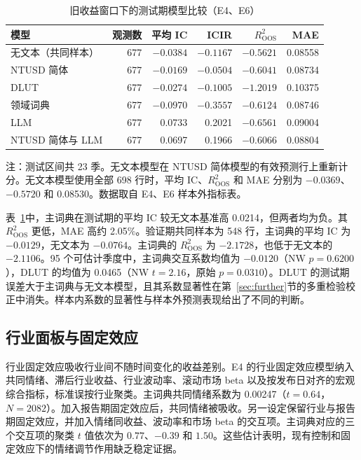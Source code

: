 \begin{table}[htbp]
  \centering\small
  \caption{旧收益窗口下的测试期模型比较（E4、E6）}\label{tab:model-oos}
  \begin{tabular}{lrrrrr}
    \toprule
    模型 & 观测数 & 平均 IC & ICIR & $R^2_{\mathrm{OOS}}$ & MAE \\
    \midrule
    无文本（共同样本） & 677 & $-0.0384$ & $-0.1167$ & $-0.5621$ & 0.08558 \\
    NTUSD 简体 & 677 & $-0.0169$ & $-0.0504$ & $-0.6041$ & 0.08734 \\
    DLUT & 677 & $-0.0274$ & $-0.1005$ & $-1.2019$ & 0.10375 \\
    领域词典 & 677 & $-0.0970$ & $-0.3557$ & $-0.6124$ & 0.08746 \\
    LLM & 677 & 0.0733 & 0.2021 & $-0.6561$ & 0.09004 \\
    NTUSD 简体与 LLM & 677 & 0.0697 & 0.1966 & $-0.6066$ & 0.08804 \\
    \bottomrule
  \end{tabular}
  \par\smallskip
  \parbox{0.9\linewidth}{\footnotesize 注：测试区间共 23 季。无文本模型在 NTUSD 简体模型的有效预测行上重新计分。无文本模型使用全部 698 行时，平均 IC、$R^2_{\mathrm{OOS}}$ 和 MAE 分别为 $-0.0369$、$-0.5720$ 和 0.08530。数据取自 E4、E6 样本外指标表。}
\end{table}

表~\ref{tab:model-oos}中，主词典在测试期的平均 IC 较无文本基准高 0.0214，但两者均为负。其 $R^2_{\mathrm{OOS}}$ 更低，MAE 高约 2.05\%。验证期共同样本为 548 行，主词典的平均 IC 为 $-0.0129$，无文本为 $-0.0764$。主词典的 $R^2_{\mathrm{OOS}}$ 为 $-2.1728$，也低于无文本的 $-2.1106$。95 个可估计季度中，主词典交互系数均值为 $-0.0120$（NW $p=0.6200$），DLUT 的均值为 0.0465（NW $t=2.16$，原始 $p=0.0310$）。DLUT 的测试期误差大于主词典与无文本模型，且其系数显著性在第~\ref{sec:further}节的多重检验校正中消失。样本内系数的显著性与样本外预测表现给出了不同的判断。

\subsection{行业面板与固定效应}

行业固定效应吸收行业间不随时间变化的收益差别。E4 的行业固定效应模型纳入共同情绪、滞后行业收益、行业波动率、滚动市场 beta 以及按发布日对齐的宏观综合指标，标准误按行业聚类。主词典共同情绪系数为 0.00247（$t=0.64$，$N=2082$）。加入报告期固定效应后，共同情绪被吸收。另一设定保留行业与报告期固定效应，并加入情绪同收益、波动率和市场 beta 的交互项。主词典对应的三个交互项的聚类 $t$ 值依次为 $0.77$、$-0.39$ 和 $1.50$。这些估计表明，现有控制和固定效应下的情绪调节作用缺乏稳定证据。

